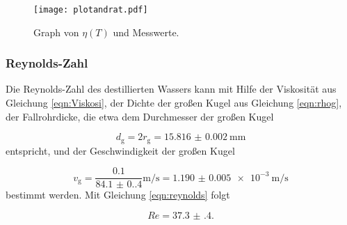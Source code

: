 \begin{figure}
  \centering
  \texttt{[image: plotandrat.pdf]}
  \caption{Graph von $\eta(T)$ und Messwerte.}
  \label{fig:VisTemp}
\end{figure}

\subsubsection{Reynolds-Zahl}

Die Reynolds-Zahl des destillierten Wassers kann mit Hilfe der Viskosität aus
Gleichung \eqref{eqn:Viskosi}, der Dichte der großen Kugel aus Gleichung
\eqref{eqn:rhog},
der Fallrohrdicke, die etwa dem Durchmesser der großen Kugel

\begin{equation}
  d_\text{g} = 2 r_\text{g} = \SI{15.816(2)}{\milli\meter}
\end{equation}
entspricht, und der Geschwindigkeit der großen Kugel

\begin{equation}
  v_\text{g} = \frac{0.1}{\num{84.1(0.4)}}\si{\meter\per\second} =
  \SI{1.190(5)e-3}{\meter\per\second}
\end{equation}
bestimmt werden.
Mit Gleichung \eqref{eqn:reynolds} folgt

\begin{equation}
  Re = \num{37.3(4)}.
\end{equation}
